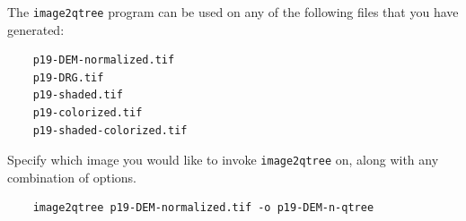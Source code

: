 The \texttt{image2qtree} program can be used on any of the following files that you 
have generated:
\begin{verbatim}
    p19-DEM-normalized.tif
    p19-DRG.tif 
    p19-shaded.tif
    p19-colorized.tif
    p19-shaded-colorized.tif
\end{verbatim}

Specify which image you would like to invoke \texttt{image2qtree} on, along
with any combination of options.

\begin{verbatim}
    image2qtree p19-DEM-normalized.tif -o p19-DEM-n-qtree
\end{verbatim}


